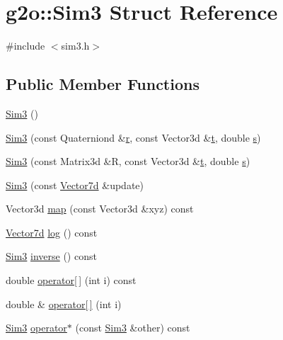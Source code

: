 \hypertarget{structg2o_1_1Sim3}{}\section{g2o\+:\+:Sim3 Struct Reference}
\label{structg2o_1_1Sim3}


{\ttfamily \#include $<$sim3.\+h$>$}

\subsection*{Public Member Functions}
\begin{DoxyCompactItemize}
\item 
\hyperlink{structg2o_1_1Sim3_adf1277575fc039d1ae643ae018e464fe}{Sim3} ()
\item 
\hyperlink{structg2o_1_1Sim3_a3f7bc6953078a87865575192221def7e}{Sim3} (const Quaterniond \&\hyperlink{structg2o_1_1Sim3_a55dbe5c6ffe22526f20e05f0c23aa832}{r}, const Vector3d \&\hyperlink{structg2o_1_1Sim3_a3ef879fb13b88732428bd2f2a558d11c}{t}, double \hyperlink{structg2o_1_1Sim3_a2cad7c49340494d4bdd28a497e4cb486}{s})
\item 
\hyperlink{structg2o_1_1Sim3_a8163b7b417a91a758b10593929bae6c5}{Sim3} (const Matrix3d \&R, const Vector3d \&\hyperlink{structg2o_1_1Sim3_a3ef879fb13b88732428bd2f2a558d11c}{t}, double \hyperlink{structg2o_1_1Sim3_a2cad7c49340494d4bdd28a497e4cb486}{s})
\item 
\hyperlink{structg2o_1_1Sim3_a252f62d72e8449ecc929a6ca0320fcbc}{Sim3} (const \hyperlink{namespaceg2o_a4740ec41130f2ecc628c81f71261c8de}{Vector7d} \&update)
\item 
Vector3d \hyperlink{structg2o_1_1Sim3_a99390dd73f03245fa9f762328c07697f}{map} (const Vector3d \&xyz) const 
\item 
\hyperlink{namespaceg2o_a4740ec41130f2ecc628c81f71261c8de}{Vector7d} \hyperlink{structg2o_1_1Sim3_a97e81fe7bee63edc34db9b174fecf30d}{log} () const 
\item 
\hyperlink{structg2o_1_1Sim3}{Sim3} \hyperlink{structg2o_1_1Sim3_a799f94914303ea87578ea7ab8e14bea9}{inverse} () const 
\item 
double \hyperlink{structg2o_1_1Sim3_a024871a45dba00e199276b90f37e41bd}{operator\mbox{[}$\,$\mbox{]}} (int i) const 
\item 
double \& \hyperlink{structg2o_1_1Sim3_ac48ebd09209c2484896f2dfe8bc673bf}{operator\mbox{[}$\,$\mbox{]}} (int i)
\item 
\hyperlink{structg2o_1_1Sim3}{Sim3} \hyperlink{structg2o_1_1Sim3_adbdfd018f974d1c270450f22a79196de}{operator$\ast$} (const \hyperlink{structg2o_1_1Sim3}{Sim3} \&other) const 

\end{DoxyCompactItemize}
